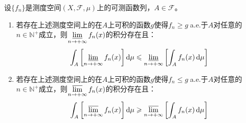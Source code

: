 \begin{corollary}\label{cor:FatouLemma}
	设$\{f_n\}$是测度空间$(X,\mathscr{F},\mu)$上的可测函数列，$A\in\mathscr{F}$。
	\begin{enumerate}
		\item 若存在上述测度空间上的在$A$上可积的函数$g$使得$f_n\geqslant g\;$a.e.于$A$对任意的$n\in\mathbb{N}^+$成立，则$\varliminf\limits_{n\to+\infty}f_n(x)$的积分存在且：
		\begin{equation*}
			\int_{A}\left[\varliminf_{n\to+\infty}f_n(x)\right]\mathop{}\!\mathrm{d}\mu\leqslant\varliminf_{n\to+\infty}\left[\int_{A}f_n(x)\mathop{}\!\mathrm{d}\mu\right]
		\end{equation*}
		\item 若存在上述测度空间上的在$A$上可积的函数$g$使得$f_n\leqslant g\;$a.e.于$A$对任意的$n\in\mathbb{N}^+$成立，则$\varlimsup\limits_{n\to+\infty}f_n(x)$的积分存在且：
		\begin{equation*}
			\int_{A}\left[\varlimsup_{n\to+\infty}f_n(x)\right]\mathop{}\!\mathrm{d}\mu\geqslant\varlimsup_{n\to+\infty}\left[\int_{A}f_n(x)\mathop{}\!\mathrm{d}\mu\right]
		\end{equation*}
	\end{enumerate}
\end{corollary}
